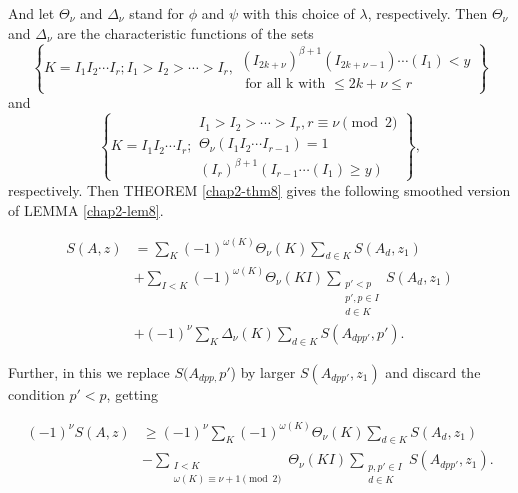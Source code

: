 And let $\Theta_\nu$ and $\Delta_\nu$ stand for $\phi$ and $\psi$ with
this choice of $\lambda$, respectively. Then $\Theta_\nu$ and
$\Delta_\nu$ are the characteristic functions of the sets 
\begin{equation*}
  \left \{
  K = I_1 I_2 \cdots I_r ; I_1 > I_2 > \cdots > I_r, 
  \begin{aligned}
    (I_{2 k+\nu})^{\beta + 1} (I_{2 k+\nu - 1}) \cdots (I_1) < y
    \\ \text { for all k with } \le 2 k + \nu \le r  
  \end{aligned}
  \right \} \tag{2.3.4}\label{eq2.3.4}
\end{equation*}
and 
\begin{equation*}
  \left \{
  K = I_1 I_2 \cdots I_r ; 
  \begin{aligned}
    I_1 > I_2 > \cdots > I_r,  r \equiv \nu \pmod{2}\\ \Theta_\nu (I_1
    I_2 \cdots I_{r - 1}) = 1 \\ (I_r)^{\beta + 1}(I_{r - 1} \cdots
    (I_1) \ge y) 
  \end{aligned}
  \right \}, 
\end{equation*}
respectively. Then THEOREM \ref{chap2-thm8} gives the following
smoothed version of LEMMA \ref{chap2-lem8}. 

\setcounter{Lemma}{8}
\begin{Lemma}\label{chap2-addlem9}%
\begin{align*}
  S(A,z) & = \sum_{K} (-1)^{\omega(K)} \Theta_\nu(K) \sum_{d \in K} S(A_d,  z_1) \\
  & + \sum_{I < K} (-1)^{\omega(K)} \Theta_\nu(KI)  \sum_{\substack{
      p' < p \\ p',  p \in I \\ d \in K}} S(A_d,z_1) \\ 
  & + (-1)^\nu \sum_{K} \Delta_\nu (K) \sum_{d \in K} S(A_{dpp'}, p').
\end{align*}
\end{Lemma}\pageoriginale

Further, in this we replace $S(A_{dpp,}p'$) by larger
$S(A_{dpp'},z_1)$ and discard the condition $p' < p$, getting 

\begin{Lemma}\label{chap2-lem10}%
  \begin{align*}
    (-1)^\nu S(A,z) & \ge (-1)^\nu \sum_{K} (-1)^{\omega(K)}
    \Theta_\nu(K) \sum_{d \in K} S(A_{d},z_1) \\ 
    & - \sum_{\substack{ I < K \\ \omega(K) \equiv \nu + 1\pmod{2}}}
    \Theta_\nu(KI) \sum_{\substack{ p,p' \in I  \\ d \in K}}
    S(A_{dpp'},z_1). 
  \end{align*}
\end{Lemma}

